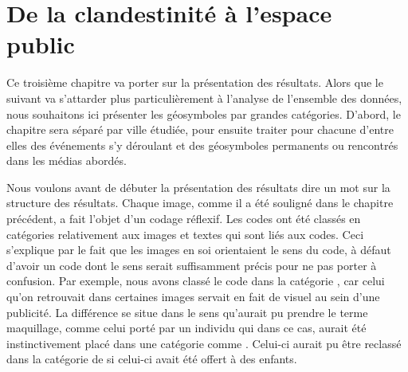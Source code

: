 
\chapter{De la clandestinité à l'espace public}
\label{cha:de_la_clandestinite_a_l_espace_public}


Ce troisième chapitre va porter sur la présentation des résultats.
Alors que le suivant va s'attarder plus particulièrement à l'analyse de l'ensemble des données, nous souhaitons ici présenter les géosymboles par grandes catégories.
D'abord, le chapitre sera séparé par ville étudiée, pour ensuite traiter pour chacune d'entre elles des événements s'y déroulant et des géosymboles permanents ou rencontrés dans les médias abordés.

Nous voulons avant de débuter la présentation des résultats dire un mot sur la structure des résultats.
Chaque image, comme il a été souligné dans le chapitre précédent, a fait l'objet d'un codage réflexif.
Les codes ont été classés en catégories relativement aux images et textes qui sont liés aux codes.
Ceci s'explique par le fait que les images en soi orientaient le sens du code, à défaut d'avoir un code dont le sens serait suffisamment précis pour ne pas porter à confusion.
Par exemple, nous avons classé le code  dans la catégorie , car celui qu'on retrouvait dans certaines images servait en fait de visuel au sein d'une publicité.
La différence se situe dans le sens qu'aurait pu prendre le terme maquillage, comme celui porté par un individu qui dans ce cas, aurait été instinctivement placé dans une catégorie comme .
Celui-ci aurait pu être reclassé dans la catégorie de  si celui-ci avait été offert à des enfants.

